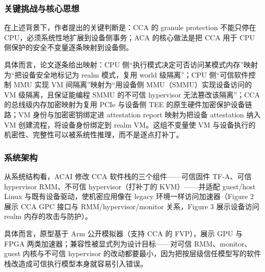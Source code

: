 \documentclass[11pt]{ctexart}
\begin{document}
\subsubsection{关键挑战与核心思想}
在上述背景下，作者提出的关键判断是：CCA 的 granule protection 不能只停在 CPU，必须系统性地扩展到设备侧事务；ACA 的核心做法是把 CCA 用于 CPU 侧保护的安全不变量逐条映射到设备侧。\par
具体而言，论文逐条给出映射：CPU 侧“执行模式决定可否访问某模式内存”映射为“把设备安全地标记为 realm 模式，复用 world 级隔离”；CPU 侧“可信软件控制 MMU 实现 VM 间隔离”映射为“用设备侧 MMU（SMMU）实现设备访问的 VM 级隔离，且保证能编程 SMMU 的不可信 hypervisor 无法篡改该隔离”；CCA 的总线级内存加密映射为复用 PCIe 与设备侧 TEE 的原生硬件加密保护设备链路；VM 身份与加密密钥绑定进 attestation report 映射为把设备 attestation 纳入 VM 创建流程，将设备身份绑定到 realm VM。这组不变量使 VM 与设备执行的机密性、完整性可以被系统性推理，而不是逐点打补丁。\par
\subsubsection{系统架构}
从系统结构看，ACAI 修改 CCA 软件栈的三个组件——可信固件 TF-A、可信 hypervisor RMM、不可信 hypervisor（打补丁的 KVM）——并适配 guest/host Linux 与既有设备驱动，使机密应用像在 legacy 环境一样访问加速器（Figure 2 展示 CCA GPC 接口与 RMM/hypervisor/monitor 关系，Figure 3 展示设备访问 realm 内存的攻击与防护）。\par
具体而言，原型基于 Arm 公开模拟器（支持 CCA 的 FVP），展示 GPU 与 FPGA 两类加速器；兼容性被显式列为设计目标——对可信 RMM、monitor、guest 内核与不可信 hypervisor 的改动都要最小，因为把按层级信任模型写的软件栈改造成可信执行模型本身就容易引入错误。\par
\end{document}
